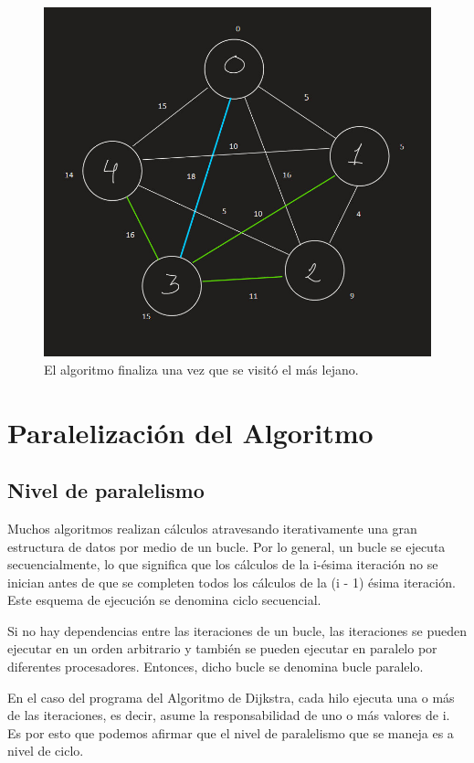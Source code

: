 \documentclass[11pt]{article}
\begin{document}
\begin{figure}[!htbp]
\centering
\includegraphics[scale = .5]{grafos5}
\caption{El algoritmo finaliza una vez que se visitó el más lejano.}
\end{figure}

\section{Paralelización del Algoritmo}
\subsection{Nivel de paralelismo}
Muchos algoritmos realizan cálculos atravesando iterativamente una gran estructura de datos por medio de un bucle. Por lo general, un bucle se ejecuta secuencialmente, lo que significa que los cálculos de la i-ésima iteración no se inician antes de que se completen todos los cálculos de la (i - 1) ésima iteración. Este esquema de ejecución se denomina ciclo secuencial.
\par
Si no hay dependencias entre las iteraciones de un bucle, las iteraciones se pueden ejecutar en un orden arbitrario y también se pueden ejecutar en paralelo por diferentes procesadores. Entonces, dicho bucle se denomina bucle paralelo.
\par 
En el caso del programa del Algoritmo de Dijkstra, cada hilo ejecuta una o más de las iteraciones, es decir, asume la responsabilidad de uno o más valores de i. Es por esto que podemos afirmar que el nivel de paralelismo que se maneja es a nivel de ciclo.
\end{document}
